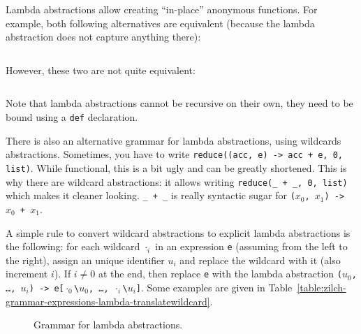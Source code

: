 Lambda abstractions allow creating ``in-place'' anonymous functions.
For example, both following alternatives are equivalent (because the lambda abstraction does not capture anything there):\\
\inputminted{\zilchlexer}{examples/captureless-lambda-equivalence.zc}
\vspace*{\baselineskip}

\noindent However, these two are not quite equivalent:\\
\inputminted{\zilchlexer}{examples/closure-non-equivalence.zc}
\vspace*{\baselineskip}

\noindent Note that lambda abstractions cannot be recursive on their own, they need to be bound using a \texttt{def} declaration.

There is also an alternative grammar for lambda abstractions, using wildcards abstractions.
Sometimes, you have to write \verb|reduce((acc, e) -> acc + e, 0, list)|.
While functional, this is a bit ugly and can be greatly shortened.
This is why there are wildcard abstractions: it allows writing \verb|reduce(_ + _, 0, list)| which makes it cleaner looking.
\verb|_ + _| is really syntactic sugar for \texttt{($x_0$, $x_1$) -> $x_0$ + $x_1$}.

A simple rule to convert wildcard abstractions to explicit lambda abstractions is the following: for each wildcard $\cdot_i$ in an expression \verb|e| (assuming from the left to the right), assign an unique identifier $u_i$ and replace the wildcard with it (also increment $i$). If $i \neq 0$ at the end, then replace \verb|e| with the lambda abstraction \texttt{($u_0$, \ldots, $u_i$) -> e[$\cdot_0$\textbackslash$u_0$, \ldots, $\cdot_i$\textbackslash$u_i$]}.
Some examples are given in Table~\ref{table:zilch-grammar-expressions-lambda-translatewildcard}.

\begin{figure}[H]
	\centering


	\caption{Grammar for lambda abstractions.}
	\label{fig:zilch-gramma-expressions-lambda-grammar}
\end{figure}


